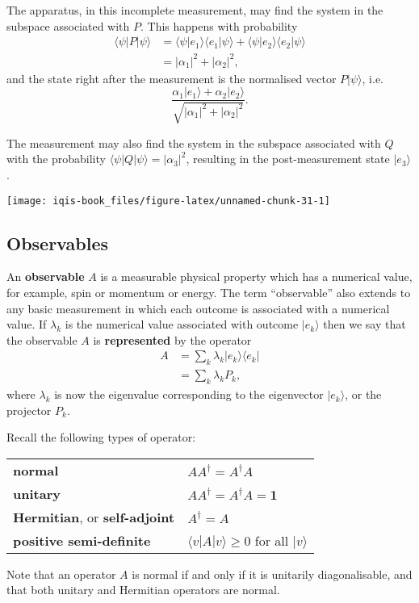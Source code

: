 \documentclass[fleqn]{article}
\newenvironment{idea}{\noindent}{\medskip}
\begin{document}
The apparatus, in this incomplete measurement, may find the system in the subspace associated with \(P\).
This happens with probability
\[
  \begin{aligned}
    \langle\psi|P|\psi\rangle
    &= \langle\psi|e_1\rangle \langle e_1|\psi\rangle + \langle\psi|e_2\rangle \langle e_2|\psi\rangle
  \\&= |\alpha_1|^2 + |\alpha_2|^2,
  \end{aligned}
\]
and the state right after the measurement is the normalised vector \(P|\psi\rangle\), i.e.
\[
  \frac{\alpha_1|e_1\rangle+\alpha_2|e_2\rangle}{\sqrt{|\alpha_1|^2 + |\alpha_2|^2}}.
\]

The measurement may also find the system in the subspace associated with \(Q\) with the probability \(\langle\psi|Q|\psi\rangle = |\alpha_3|^2\), resulting in the post-measurement state \(|e_3\rangle\).

\begin{center}\texttt{[image: iqis-book\_files/figure-latex/unnamed-chunk-31-1]} \end{center}

\hypertarget{observables}{%
\subsection{Observables}\label{observables}}

An \textbf{observable} \(A\) is a measurable physical property which has a numerical value, for example, spin or momentum or energy.
The term ``observable'' also extends to any basic measurement in which each outcome is associated with a numerical value.
If \(\lambda_k\) is the numerical value associated with outcome \(|e_k\rangle\) then we say that the observable \(A\) is \textbf{represented} by the operator
\[
  \begin{aligned}
    A
    &= \sum_k \lambda_k |e_k\rangle\langle e_k|
  \\&= \sum_k \lambda_k P_k,
  \end{aligned}
\]
where \(\lambda_k\) is now the eigenvalue corresponding to the eigenvector \(|e_k\rangle\), or the projector \(P_k\).

\begin{idea}
Recall the following types of operator:

\begin{longtable}[]{@{}ll@{}}
\toprule
\endhead
\textbf{normal} & \(AA^\dagger = A^\dagger A\)\tabularnewline
\textbf{unitary} & \(AA^\dagger = A^\dagger A = \mathbf{1}\)\tabularnewline
\textbf{Hermitian}, or \textbf{self-adjoint} & \(A^\dagger = A\)\tabularnewline
\textbf{positive semi-definite} & \(\langle v|A|v\rangle\geqslant 0\) for all \(|v\rangle\)\tabularnewline
\bottomrule
\end{longtable}

Note that an operator \(A\) is normal if and only if it is unitarily diagonalisable, and that both unitary and Hermitian operators are normal.

\end{idea}
\end{document}

